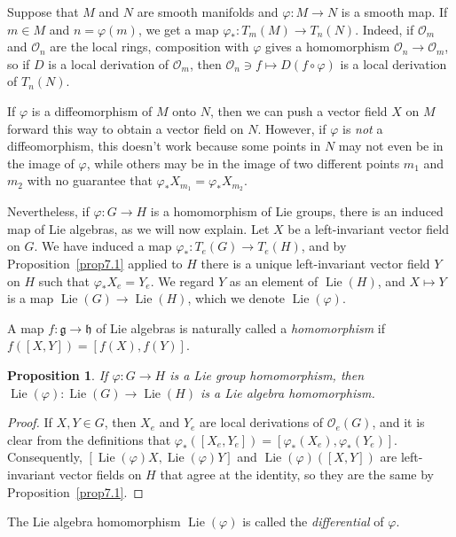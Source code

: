 \documentclass[12pt,reqno]{book}%
\newtheorem{proposition}{Proposition}[chapter]
\theoremstyle{definition}
\theoremstyle{remark}
\theoremstyle{theorem}
\theoremstyle{remark}
\DeclareMathOperator{\Lie}{Lie}
\begin{document}
Suppose that $M$ and $N$ are smooth manifolds and $\varphi : M \to N$ is a smooth map.
If $m \in M$ and $n = \varphi(m)$, we get a map $\varphi_* : T_m(M) \to T_n(N)$.
Indeed, if $\mathcal{O}_m$ and $\mathcal{O}_n$ are the local rings, composition with $\varphi$ gives a homomorphism $\mathcal{O}_n \to \mathcal{O}_m$, so if $D$ is a local derivation of $\mathcal{O}_m$, then $\mathcal{O}_n \ni f \mapsto D(f \circ \varphi)$ is a local derivation of $T_n(N)$.

If $\varphi$ is a diffeomorphism of $M$ onto $N$, then we can push a vector field $X$ on $M$ forward this way to obtain a vector field on $N$.
However, if $\varphi$ is \emph{not} a diffeomorphism, this doesn't work because some points in $N$ may not even be in the image of $\varphi$, while others may be in the image of two different points $m_1$ and $m_2$ with no guarantee that $\varphi_*X_{m_1} = \varphi_*X_{m_2}$.

Nevertheless, if $\varphi : G \to H$ is a homomorphism of Lie groups, there is an induced map of Lie algebras, as we will now explain.
Let $X$ be a left-invariant vector field on $G$.
We have induced a map $\varphi_* : T_e(G) \to T_e(H)$, and by Proposition~\ref{prop7.1} applied to $H$ there is a unique left-invariant vector field $Y$ on $H$ such that $\varphi_*X_e = Y_e$.
We regard $Y$ as an element of $\Lie(H)$, and $X \mapsto Y$ is a map $\Lie(G) \to \Lie(H)$, which we denote $\Lie(\varphi)$.

A map $f : \mathfrak{g} \to \mathfrak{h}$ of Lie algebras is naturally called a \emph{homomorphism} if $f([X, Y]) = [f(X), f(Y)]$.

\begin{proposition}\label{prop7.3}%
    If $\varphi : G \to H$ is a Lie group homomorphism, then $\Lie(\varphi) : \Lie(G) \to \Lie(H)$ is a Lie algebra homomorphism.
\end{proposition}%
\begin{proof}%
    If $X, Y \in G$, then $X_e$ and $Y_e$ are local derivations of $\mathcal{O}_e(G)$, and it is clear from the definitions that $\varphi_*([X_e, Y_e]) = [\varphi_*(X_e), \varphi_*(Y_e)]$.
    Consequently, $[\Lie(\varphi)X, \Lie(\varphi)Y]$ and $\Lie(\varphi)([X, Y])$ are left-invariant vector fields on $H$ that agree at the identity, so they are the same by Proposition~\ref{prop7.1}.
\end{proof}%

The Lie algebra homomorphism $\Lie(\varphi)$ is called the \emph{differential} of $\varphi$.
\end{document}
